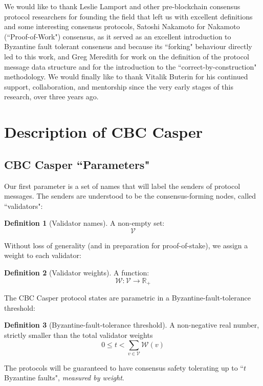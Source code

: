\documentclass{article}
\theoremstyle{definition}
\newtheorem{defn}{Definition}[section]
\begin{document}
We would like to thank Leslie Lamport and other pre-blockchain consensus protocol researchers for founding the field that left us with excellent definitions and some interesting consensus protocols, Satoshi Nakamoto for Nakamoto (``Proof-of-Work") consensus\cite{nakamoto}, as it served as an excellent introduction to Byzantine fault tolerant consensus and because its ``forking" behaviour directly led to this work, and Greg Meredith for work on the definition of the protocol message data structure and for the introduction to the ``correct-by-construction" methodology. We would finally like to thank Vitalik Buterin for his continued support, collaboration, and mentorship since the very early stages of this research, over three years ago.

\pagebreak
\section{Description of CBC Casper}

\subsection{CBC Casper ``Parameters"}

Our first parameter is a set of names that will label the senders of protocol messages. The senders are understood to be the consensus-forming nodes, called ``validators":

\begin{defn}[Validator names]
A non-empty set:
$$
\mathcal{V}
$$
\end{defn}

Without loss of generality (and in preparation for proof-of-stake), we assign a weight to each validator:

\begin{defn}[Validator weights]
A function:
$$
\mathcal{W}: \mathcal{V} \to \mathbb{R}_+
$$
\end{defn}

The CBC Casper protocol states are parametric in a Byzantine-fault-tolerance threshold:

\begin{defn}[Byzantine-fault-tolerance threshold]
A non-negative real number, strictly smaller than the total validator weights
$$0 \leq t < \sum_{v \in \mathcal{V}} \mathcal{W}(v)$$
\end{defn}

The protocols will be guaranteed to have consensus safety tolerating up to ``$t$ Byzantine faults", \emph{measured by weight}.
\end{document}
